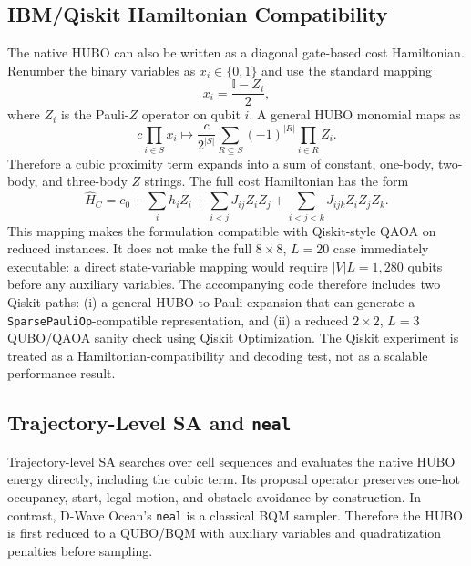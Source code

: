 \documentclass[10pt,conference]{IEEEtran}
\begin{document}
\subsection{IBM/Qiskit Hamiltonian Compatibility}
The native HUBO can also be written as a diagonal gate-based cost Hamiltonian. Renumber the binary variables as $x_i\in\{0,1\}$ and use the standard mapping
\begin{equation}
    x_i=\frac{\mathbb{I}-Z_i}{2},
\end{equation}
where $Z_i$ is the Pauli-$Z$ operator on qubit $i$. A general HUBO monomial maps as
\begin{equation}
    c\prod_{i\in S}x_i \mapsto \frac{c}{2^{|S|}}\sum_{R\subseteq S}(-1)^{|R|}\prod_{i\in R}Z_i .
    \label{eq:pauli_mapping}
\end{equation}
Therefore a cubic proximity term expands into a sum of constant, one-body, two-body, and three-body $Z$ strings. The full cost Hamiltonian has the form
\begin{equation}
\hat{H}_C=c_0+\sum_i h_iZ_i+\sum_{i<j}J_{ij}Z_iZ_j+
\sum_{i<j<k}J_{ijk}Z_iZ_jZ_k .
\end{equation}
This mapping makes the formulation compatible with Qiskit-style QAOA on reduced instances. It does not make the full $8\times8$, $L=20$ case immediately executable: a direct state-variable mapping would require $|V|L=1,280$ qubits before any auxiliary variables. The accompanying code therefore includes two Qiskit paths: (i) a general HUBO-to-Pauli expansion that can generate a \texttt{SparsePauliOp}-compatible representation, and (ii) a reduced $2\times2$, $L=3$ QUBO/QAOA sanity check using Qiskit Optimization. The Qiskit experiment is treated as a Hamiltonian-compatibility and decoding test, not as a scalable performance result.


\subsection{Trajectory-Level SA and \texttt{neal}}
Trajectory-level SA searches over cell sequences and evaluates the native HUBO energy directly, including the cubic term. Its proposal operator preserves one-hot occupancy, start, legal motion, and obstacle avoidance by construction. In contrast, D-Wave Ocean's \texttt{neal} is a classical BQM sampler. Therefore the HUBO is first reduced to a QUBO/BQM with auxiliary variables and quadratization penalties before sampling.
\end{document}

